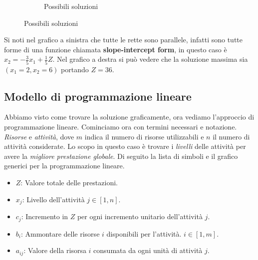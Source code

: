 \documentclass{article}
\begin{document}
\begin{figure}[ht]
\begin{subfigure}[b]{0.50\textwidth}
          \caption{Possibili soluzioni}
        \end{subfigure}

      \end{figure}

      Si noti nel grafico a sinistra che tutte le rette sono parallele, infatti sono tutte forme di una funzione chiamata \textbf{slope-intercept form}, in questo caso è $x_2=-\frac{3}{5}x_1+\frac{1}{5}Z$. Nel grafico a destra si può vedere che la soluzione massima sia $(x_1=2,x_2=6)$ portando $Z=36$.

  \subsection{Modello di programmazione lineare}
    Abbiamo visto come trovare la soluzione graficamente, ora vediamo l'approccio di programmazione lineare. Cominciamo ora con termini necessari e notazione. \textit{Risorse} e \textit{attività}, dove $m$ indica il numero di risorse utilizzabili e $n$ il numero di attività considerate. Lo scopo in questo caso è trovare i \textit{livelli} delle attività per avere la \textit{migliore prestazione globale}. Di seguito la lista di simboli e il grafico generici per la programmazione lineare.
    \begin{itemize}
      \item $Z$: Valore totale delle prestazioni.
      \item $x_j$: Livello dell'attività $j\in[1,n]$.
      \item $c_j$: Incremento in $Z$ per ogni incremento unitario dell'attività $j$.
      \item $b_i$: Ammontare delle risorse $i$ disponibili per l'attività. $i\in[1,m]$.
      \item $a_{ij}$: Valore della risorsa $i$ consumata da ogni unità di attività $j$.
    \end{itemize}
    
\end{document}
